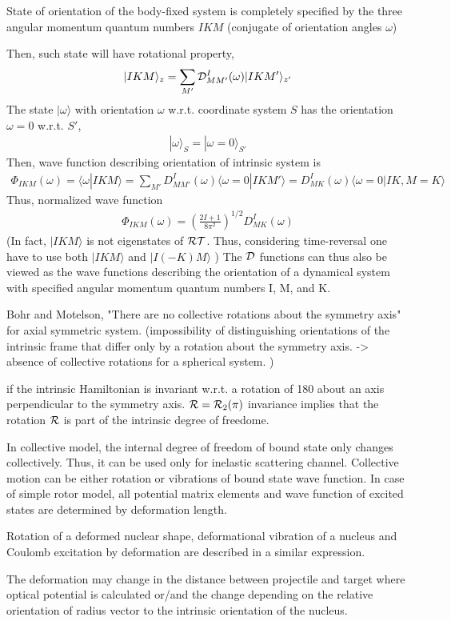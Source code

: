 \documentclass[11pt]{book}
\def\la{\langle}
\def\ra{\rangle}
\newcommand{\bea}{\begin{eqnarray}}
\newcommand{\eea}{\end{eqnarray}}
\begin{document}
State of orientation of the body-fixed system is completely specified by 
the three angular momentum quantum numbers $IKM$ (conjugate of orientation angles $\omega$)

Then, such state will have rotational property,
\bea 
|IKM\ra_{z}  = \sum_{M'} {\cal D}^I_{M M'}(\omega)|I K M'\ra_{z'}  
\eea 
The state $|\omega\ra$ with orientation $\omega$ w.r.t. coordinate system $S$
has the orientation $\omega=0$ w.r.t. $S'$,
\bea 
|\omega\ra_{S}=|\omega=0\ra_{S'}
\eea 
Then, wave function describing orientation of intrinsic system is 
\bea 
\Phi_{IKM}(\omega)=\la \omega|IKM\ra 
                  =\sum_{M'} D^{I}_{MM'}(\omega)\la \omega=0|IKM'\ra 
                  = D^{I}_{MK}(\omega)\la \omega=0|IK,M=K\ra  
\eea 
Thus, normalized wave function
\bea 
\Phi_{IKM}(\omega)=\left(\frac{2I+1}{8\pi^2}\right)^{1/2} D^I_{MK}(\omega)
\eea 
(In fact, $|IKM\ra$ is not eigenstates of ${\cal R}{\cal T}$.
Thus, considering time-reversal one have to use both $|IKM\ra$ and $|I(-K)M\ra$ )
The ${\cal D}$ functions can thus also be viewed as the wave functions describing the
orientation of a dynamical system with specified angular momentum quantum numbers
I, M, and K.

Bohr and Motelson, "There are no collective rotations about the symmetry axis" for axial symmetric
system. (impossibility of distinguishing orientations of the intrinsic frame that 
differ only by a rotation about the symmetry axis. -> absence of collective rotations
for a spherical system. )

if the intrinsic Hamiltonian is invariant w.r.t. a rotation of 180 about an axis perpendicular to
the symmetry axis. ${\cal R}={\cal R}_2(\pi)$ invariance implies that 
the rotation ${\cal R}$ is part of the intrinsic degree of freedome. 








In collective model, the internal degree of freedom of bound state
only changes collectively. Thus, it can be used only for inelastic scattering 
channel. Collective motion can be either rotation or vibrations 
of bound state wave function. 
In case of simple rotor model, all potential matrix elements and 
wave function of excited states are determined by deformation length.  

Rotation of a deformed nuclear shape, deformational vibration of a nucleus
and Coulomb excitation by deformation are described in a similar expression.

The deformation may change in the distance between projectile and target
where optical potential is calculated or/and the change depending on the
relative orientation of radius vector to the intrinsic orientation of the nucleus. 
\end{document}
